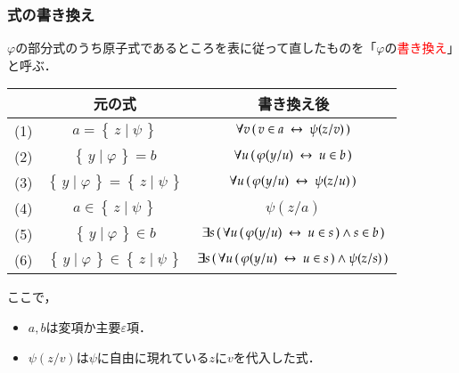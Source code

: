 \documentclass[dvipdfmx,10pt,notheorems]{beamer}
\theoremstyle{definition}
\newcommand{\Set}[2]{\left\{\, #1 \mid #2\, \right\}} %
\newcommand{\lrarrow}{\hspace{0.25em}\leftrightarrow\hspace{0.25em}} %
\begin{document}
\begin{frame}\frametitle{式の書き換え}
	$\varphi$の部分式のうち原子式であるところを表に従って直したものを「$\varphi$の\textcolor{red}{書き換え}」と呼ぶ．
	
	\begin{table}[H]
		\begin{center}
		\begin{tabular}{c|c|c}
			 & 元の式 & 書き換え後 \\ \hline \hline
			(1) & $a = \Set{z}{\psi}$ & $\forall v\, (\, v \in a \lrarrow \psi(z/v)\, )$ \\ \hline
			(2) & $\Set{y}{\varphi} = b$ & $\forall u\, (\, \varphi(y/u) \lrarrow u \in b\, )$ \\ \hline
			(3) & $\Set{y}{\varphi} = \Set{z}{\psi}$ & $\forall u\, (\, \varphi(y/u) \lrarrow \psi(z/u)\, )$ \\ \hline
			(4) & $a \in \Set{z}{\psi}$ & $\psi(z/a)$ \\ \hline
			(5) & $\Set{y}{\varphi} \in b$ & $\exists s\, (\, \forall u\, (\, \varphi(y/u) \lrarrow u \in s\, ) \wedge s \in b\, )$ \\ \hline
			(6) & $\Set{y}{\varphi} \in \Set{z}{\psi}$ & $\exists s\, (\, \forall u\, (\, \varphi(y/u) \lrarrow u \in s\, ) \wedge \psi(z/s)\, )$ \\ \hline
		\end{tabular}
		\end{center}
	\end{table}
	
	ここで，
	\begin{itemize}
		\item $a,b$は変項か主要$\varepsilon$項．
		\item $\psi(z/v)$は$\psi$に自由に現れている$z$に$v$を代入した式．
	\end{itemize}
\end{frame}
\end{document}

